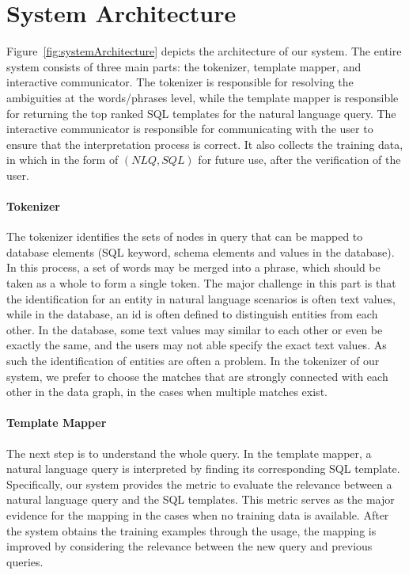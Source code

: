 \documentclass{vldb}
\begin{document}
\section{System Architecture}
\label{sec:architecture}
Figure~\ref{fig:systemArchitecture} depicts the architecture of our system. The entire system consists of three main parts: the tokenizer, template mapper, and interactive communicator.  The tokenizer is responsible for resolving the ambiguities at the words/phrases level, while the template mapper is responsible for returning the top ranked SQL templates for the natural language query.  The interactive communicator is responsible for communicating with the user to ensure that the interpretation process is correct.  It also collects the training data, in which in the form of $(NLQ, SQL)$ for future use, after the verification of the user.  

\paragraph*{Tokenizer}
The tokenizer identifies the sets of nodes in query that can be mapped to database elements (SQL keyword, schema elements and values in the database).  In this process, a set of words may be merged into a phrase, which should be taken as a whole to form a single token.  The major challenge in this part is that the identification for an entity in natural language scenarios is often text values, while in the database, an id is often defined to distinguish entities from each other.  In the database, some text values may similar to each other or even be exactly the same, and the users may not able specify the exact text values.  As such the identification of entities are often a problem.  In the tokenizer of our system, we prefer to choose the matches that are strongly connected with each other in the data graph, in the cases when multiple matches exist.  

\paragraph*{Template Mapper}
The next step is to understand the whole query.  In the template mapper, a natural language query is interpreted by finding its corresponding SQL template.  Specifically, our system provides the metric to evaluate the relevance between a natural language query and the SQL templates.  This metric serves as the major evidence for the mapping in the cases when no training data is available.  After the system obtains the training examples through the usage, the mapping is improved by considering the relevance between the new query and previous queries.
\end{document}
